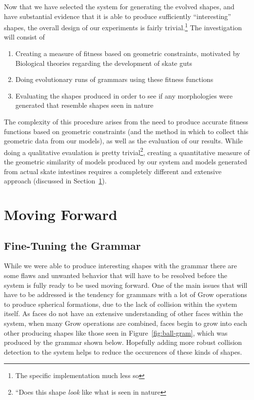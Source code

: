 \documentclass[condensed]{union-cs-thesis}
\begin{document}
\par
Now that we have selected the system for generating the evolved shapes, and have substantial evidence that it is able to produce sufficiently ``interesting'' shapes, the overall design of our experiments is fairly trivial.\footnote{The specific implementation much less so}  The investigation will consist of
\begin{enumerate}
\item Creating a measure of fitness based on geometric constraints, motivated by Biological theories regarding the development of skate guts
\item Doing evolutionary runs of grammars using these fitness functions
\item Evaluating the shapes produced in order to see if any morphologies were generated that resemble shapes seen in nature
\end{enumerate}
The complexity of this procedure arises from the need to produce accurate fitness functions based on geometric constraints (and the method in which to collect this geometric data from our models), as well as the evaluation of our results.  While doing a qualitative evaulation is pretty trivial\footnote{``Does this shape \emph{look} like what is seen in nature}, creating a quantitative measure of the geometric similarity of models produced by our system and models generated from actual skate intestines requires a completely different and extensive approach (discussed in Section~\ref{sec:future}).


\section{Moving Forward} \label{sec:future}

\subsection{Fine-Tuning the Grammar}
While we were able to produce interesting shapes with the grammar there are some flaws and unwanted behavior that will have to be resolved before the system is fully ready to be used moving forward.  One of the main issues that will have to be addressed is the tendency for grammars with a lot of Grow operations to produce spherical formations, due to the lack of collision within the system itself.  As faces do not have an extensive understanding of other faces within the system, when many Grow operations are combined, faces begin to grow into each other producing shapes like those seen in Figure~\ref{fig:ball-gram}, which was produced by the grammar shown below.  Hopefully adding more robust collision detection to the system helps to reduce the occurences of these kinds of shapes.
\end{document}
